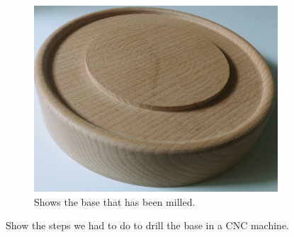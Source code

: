 \documentclass[04.3_buildingProcess.tex]{subfiles}
\begin{document}
\begin{figure}[H]
\begin{subfigure}{.45\textwidth}
            \includegraphics[scale=0.05]{images/materialProcess/base.jpg}
            \caption{Shows the base that has been milled.}
            \label{fig:blossomBase}
            \vspace{6mm}
        \end{subfigure}
        \caption{Show the steps we had to do to drill the base in a CNC machine.}
        \label{fig:laserCutTests}
    \end{figure}
\end{document}
